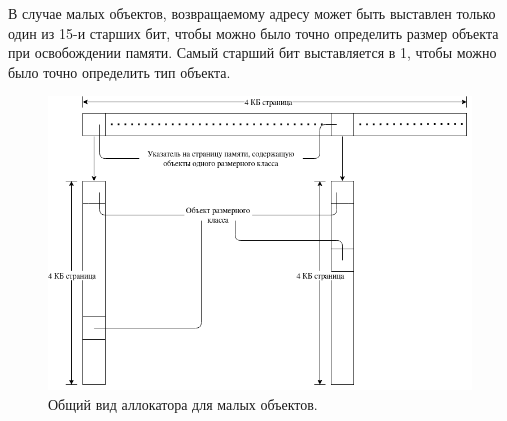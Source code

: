 В случае малых объектов, возвращаемому адресу может быть выставлен только один из 15-и старших бит, чтобы можно было точно определить размер объекта при освобождении памяти. Самый старший бит выставляется в 1, чтобы можно было точно определить тип объекта.

\begin{figure}[!h]
	\begin{center}
		\includegraphics[scale=0.6]{images/small-allocator-design.png}
		\caption{Общий вид аллокатора для малых объектов.}
		\label{small-allocator-design}
	\end{center}
\end{figure}

